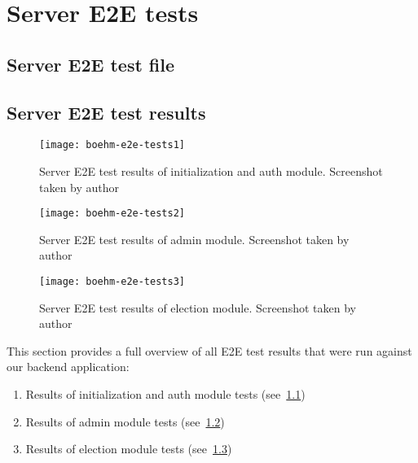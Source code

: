 \chapter{Server E2E tests}\label{ch:apx-server-e2e-tests}

\section{Server E2E test file}\label{sec:full-server-e2e-test-file}


\section{Server E2E test results}\label{sec:full-server-e2e-test-results}

\begin{figure}[H]
    \centering
    \texttt{[image: boehm-e2e-tests1]}
    \caption[Server E2E test results of initialization and auth module]{Server E2E test results of initialization and auth module. Screenshot taken by author}
    \label{fig:apx-e2e-tests-1}
\end{figure}

\begin{figure}[H]
    \centering
    \texttt{[image: boehm-e2e-tests2]}
    \caption[Server E2E test results of admin module]{Server E2E test results of admin module. Screenshot taken by author}
    \label{fig:apx-e2e-tests-2}
\end{figure}

\begin{figure}[H]
    \centering
    \texttt{[image: boehm-e2e-tests3]}
    \caption[Server E2E test results of election module]{Server E2E test results of election module. Screenshot taken by author}
    \label{fig:apx-e2e-tests-3}
\end{figure}

This section provides a full overview of all \gls{E2E} test results that were run against our backend application:

\begin{enumerate}
    \item Results of initialization and auth module tests (see~\cref{fig:apx-e2e-tests-1})
    \item Results of admin module tests (see~\cref{fig:apx-e2e-tests-2})
    \item Results of election module tests (see~\cref{fig:apx-e2e-tests-3})
\end{enumerate}

